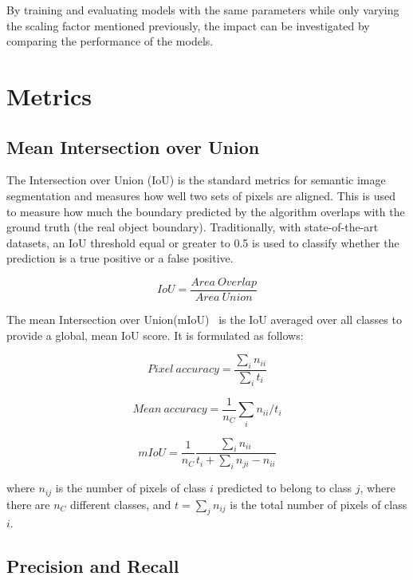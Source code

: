 \documentclass[oneside, english, bibtex]{kththesis}
\begin{document}
By training and evaluating models with the same parameters while only varying the scaling factor mentioned previously, the impact can be investigated by comparing the performance of the models.


\section{Metrics}

\subsection{Mean Intersection over Union}

The Intersection over Union (IoU) is the standard metrics for semantic image segmentation and measures how well two sets of pixels are aligned. This is used to measure how much the boundary predicted by the algorithm overlaps with the ground truth (the real object boundary). Traditionally, with state-of-the-art datasets, an IoU threshold equal or greater to 0.5 is used to classify whether the prediction is a true positive or a false positive.

\begin{equation}
	IoU = \frac{Area \: Overlap}{Area \: Union}
  	\label{eqn:iou}
\end{equation}

The mean Intersection over Union(mIoU)~\cite{DBLP:journals/corr/LongSD14} is the IoU averaged over all classes to provide a global, mean IoU score. It is formulated as follows:

\begin{equation}
	Pixel \: accuracy = \frac{\sum_{i} n_{ii}}{\sum_{i}t_i}
  	\label{eqn:pixelacc}
\end{equation}

\begin{equation}
	Mean \: accuracy = \frac{1}{n_C} \sum_{i} n_{ii} / t_i
  	\label{eqn:meanacc}
\end{equation}

\begin{equation}
	mIoU = \frac{1}{n_C} \frac{\sum_{i} n_{ii}}{t_i + \sum_{i} n_{ji} - n_{ii}}
  	\label{eqn:meanIoU}
\end{equation}

where $n_{ij}$ is the number of pixels of class $i$ predicted to belong to class $j$, where there are $n_{C}$ different classes, and $t = \sum_{j} n_{ij}$ is the total number of pixels of class $i$.

\subsection{Precision and Recall}
\end{document}
